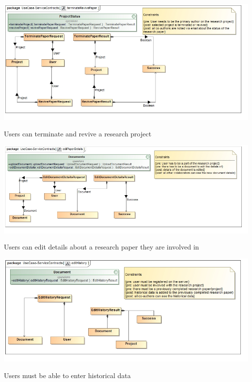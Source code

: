 \documentclass[a4paper,12pt]{report}
\begin{document}
\begin{flushleft}
	\includegraphics[scale=0.5]{./images/class__terminateRevivePaper.jpg}
	\begin{center}
		Users can terminate and revive a research project
	\end{center}
\end{flushleft}

\newpage

\begin{flushleft}
	\includegraphics[scale=0.5]{./images/class__editPaperDetails.jpg}
	\begin{center}
		Users can edit details about a research paper they are involved in
	\end{center}
\end{flushleft}

\begin{flushleft}
	\includegraphics[scale=0.5]{./images/class__editHistory.jpg}
	\begin{center}
		Users must be able to enter historical data
	\end{center}
\end{flushleft}
\end{document}

